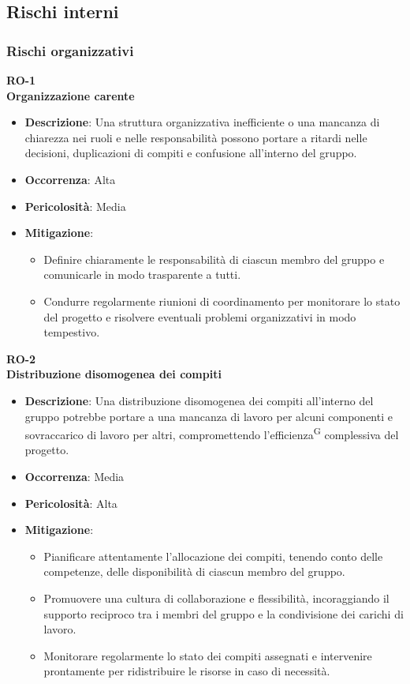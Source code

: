 \documentclass[5pt]{article}
\begin{document}
  \subsection{Rischi interni}
    \subsubsection{Rischi organizzativi}
      \textbf{RO-1}\\
      \textbf{Organizzazione carente}
      \begin{itemize}
        \item \textbf{Descrizione}: Una struttura organizzativa inefficiente o una mancanza di chiarezza nei ruoli e nelle responsabilità possono portare a ritardi nelle decisioni, duplicazioni di compiti e confusione all'interno del gruppo.
        \item \textbf{Occorrenza}: Alta
        \item \textbf{Pericolosità}: Media
        \item \textbf{Mitigazione}: 
          \begin{itemize}
            \item Definire chiaramente le responsabilità di ciascun membro del gruppo e comunicarle in modo trasparente a tutti.
            \item Condurre regolarmente riunioni di coordinamento per monitorare lo stato del progetto e risolvere eventuali problemi organizzativi in modo tempestivo.
          \end{itemize}
      \end{itemize}
      \textbf{RO-2}\\
      \textbf{Distribuzione disomogenea dei compiti}
      \begin{itemize}
        \item \textbf{Descrizione}: Una distribuzione disomogenea dei compiti all'interno del gruppo potrebbe portare a una mancanza di lavoro per alcuni componenti e sovraccarico di lavoro per altri, compromettendo l'efficienza\textsuperscript{G} complessiva del progetto.
        \item \textbf{Occorrenza}: Media
        \item \textbf{Pericolosità}: Alta
        \item \textbf{Mitigazione}: 
          \begin{itemize}
            \item Pianificare attentamente l'allocazione dei compiti, tenendo conto delle competenze, delle disponibilità di ciascun membro del gruppo.
            \item Promuovere una cultura di collaborazione e flessibilità, incoraggiando il supporto reciproco tra i membri del gruppo e la condivisione dei carichi di lavoro.
            \item Monitorare regolarmente lo stato dei compiti assegnati e intervenire prontamente per ridistribuire le risorse in caso di necessità.
          \end{itemize}
      \end{itemize}
\end{document}
